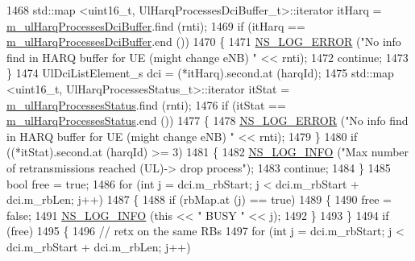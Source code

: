 \begin{DoxyCode}
1468               std::map <uint16\_t, UlHarqProcessesDciBuffer\_t>::iterator itHarq = 
      \hyperlink{classns3_1_1FdBetFfMacScheduler_a9b0359136a7f50a8baf80b3b17367869}{m\_ulHarqProcessesDciBuffer}.find (rnti);
1469               \textcolor{keywordflow}{if} (itHarq == \hyperlink{classns3_1_1FdBetFfMacScheduler_a9b0359136a7f50a8baf80b3b17367869}{m\_ulHarqProcessesDciBuffer}.end ())
1470                 \{
1471                   \hyperlink{group__logging_ga0261a8db1d4ac5f79417d117634fd455}{NS\_LOG\_ERROR} (\textcolor{stringliteral}{"No info find in HARQ buffer for UE (might change eNB) "} << 
      rnti);
1472                   \textcolor{keywordflow}{continue};
1473                 \}
1474               UlDciListElement\_s dci = (*itHarq).second.at (harqId);
1475               std::map <uint16\_t, UlHarqProcessesStatus\_t>::iterator itStat = 
      \hyperlink{classns3_1_1FdBetFfMacScheduler_a7abd82b962ddf3b3fb688de9528bc04a}{m\_ulHarqProcessesStatus}.find (rnti);
1476               \textcolor{keywordflow}{if} (itStat == \hyperlink{classns3_1_1FdBetFfMacScheduler_a7abd82b962ddf3b3fb688de9528bc04a}{m\_ulHarqProcessesStatus}.end ())
1477                 \{
1478                   \hyperlink{group__logging_ga0261a8db1d4ac5f79417d117634fd455}{NS\_LOG\_ERROR} (\textcolor{stringliteral}{"No info find in HARQ buffer for UE (might change eNB) "} << 
      rnti);
1479                 \}
1480               \textcolor{keywordflow}{if} ((*itStat).second.at (harqId) >= 3)
1481                 \{
1482                   \hyperlink{group__logging_gafbd73ee2cf9f26b319f49086d8e860fb}{NS\_LOG\_INFO} (\textcolor{stringliteral}{"Max number of retransmissions reached (UL)-> drop process"});
1483                   \textcolor{keywordflow}{continue};
1484                 \}
1485               \textcolor{keywordtype}{bool} free = \textcolor{keyword}{true};
1486               \textcolor{keywordflow}{for} (\textcolor{keywordtype}{int} j = dci.m\_rbStart; j < dci.m\_rbStart + dci.m\_rbLen; j++)
1487                 \{
1488                   \textcolor{keywordflow}{if} (rbMap.at (j) == \textcolor{keyword}{true})
1489                     \{
1490                       free = \textcolor{keyword}{false};
1491                       \hyperlink{group__logging_gafbd73ee2cf9f26b319f49086d8e860fb}{NS\_LOG\_INFO} (\textcolor{keyword}{this} << \textcolor{stringliteral}{" BUSY "} << j);
1492                     \}
1493                 \}
1494               \textcolor{keywordflow}{if} (free)
1495                 \{
1496                   \textcolor{comment}{// retx on the same RBs}
1497                   \textcolor{keywordflow}{for} (\textcolor{keywordtype}{int} j = dci.m\_rbStart; j < dci.m\_rbStart + dci.m\_rbLen; j++)

\end{DoxyCode}
